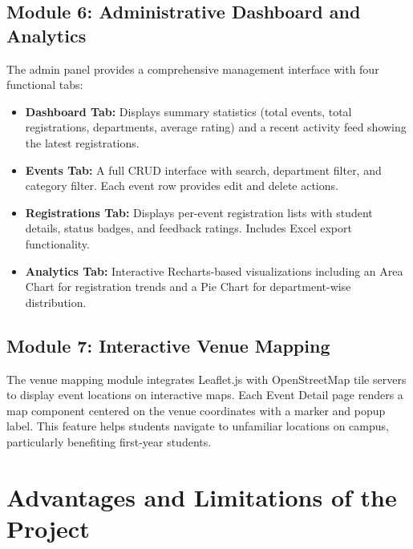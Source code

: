 \subsection{Module 6: Administrative Dashboard and Analytics}
The admin panel provides a comprehensive management interface with four functional tabs:
\begin{itemize}
    \item \textbf{Dashboard Tab:} Displays summary statistics (total events, total registrations, departments, average rating) and a recent activity feed showing the latest registrations.
    \item \textbf{Events Tab:} A full CRUD interface with search, department filter, and category filter. Each event row provides edit and delete actions.
    \item \textbf{Registrations Tab:} Displays per-event registration lists with student details, status badges, and feedback ratings. Includes Excel export functionality.
    \item \textbf{Analytics Tab:} Interactive Recharts-based visualizations including an Area Chart for registration trends and a Pie Chart for department-wise distribution.
\end{itemize}

\subsection{Module 7: Interactive Venue Mapping}
The venue mapping module integrates Leaflet.js with OpenStreetMap tile servers to display event locations on interactive maps. Each Event Detail page renders a map component centered on the venue coordinates with a marker and popup label. This feature helps students navigate to unfamiliar locations on campus, particularly benefiting first-year students.

\section{Advantages and Limitations of the Project}

